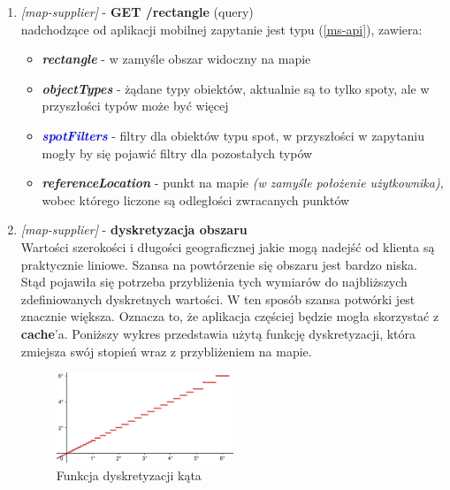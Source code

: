 \begin{enumerate}
    \item
    \Large{\emph{[map-supplier]} - \textbf{GET /rectangle} (query)}\normalsize\\
    nadchodzące od aplikacji mobilnej zapytanie jest typu  (\ref{ms-api}), zawiera:
    \begin{itemize}
        \item
        \textbf{\emph{rectangle}} - w zamyśle obszar widoczny na mapie

        \item
        \textbf{\emph{objectTypes}} - żądane typy obiektów, aktualnie są to tylko spoty, ale w przyszłości typów może być więcej

        \item
        \textbf{\textcolor{blue}{\emph{spotFilters}}} - filtry dla obiektów typu spot, w przyszłości w zapytaniu mogły by się pojawić filtry dla pozostałych typów

        \item
        \textbf{\emph{referenceLocation}} - punkt na mapie \emph{(w zamyśle położenie użytkownika)}, wobec którego liczone są odległości zwracanych punktów
    \end{itemize} 


    \item
    \Large\emph{[map-supplier]} - \textbf{dyskretyzacja obszaru}\normalsize\\
    Wartości szerokości i długości geograficznej jakie mogą nadejść od klienta są praktycznie liniowe.
    Szansa na powtórzenie się obszaru jest bardzo niska. Stąd pojawiła się potrzeba przybliżenia tych wymiarów do najbliższych zdefiniowanych dyskretnych wartości.
    W ten sposób szansa potwórki jest znacznie większa. Oznacza to, że aplikacja częściej będzie mogła skorzystać z \textbf{cache}'a.
    Poniższy wykres przedstawia użytą funkcję dyskretyzacji, która zmiejsza swój stopień wraz z przybliżeniem na mapie.

    \begin{figure}[H]
        \begin{center}
            \includegraphics[width=0.5\textwidth]{img/lat-long-discretization}
        \end{center}
        \caption{Funkcja dyskretyzacji kąta}
    \end{figure}


\end{enumerate}
